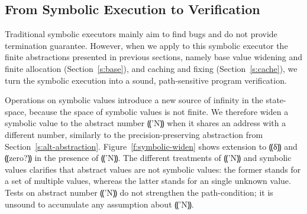 \subsection{From Symbolic Execution to Verification}

Traditional symbolic executors mainly aim to find bugs and do not provide
termination guarantee. However, when we apply to this symbolic executor the
finite abstractions presented in previous sections, namely base value widening
and finite allocation (Section~\ref{s:base}), and caching and fixing
(Section~\ref{s:cache}), we turn the symbolic execution into a sound,
path-sensitive program verification.

Operations on symbolic values introduce a new source of infinity in the
state-space, because the space of symbolic values is not finite. We therefore
widen a symbolic value to the abstract number ⸨'N⸩ when it shares an address
with a different number, similarly to the precision-preserving abstraction from
Section~\ref{s:alt-abstraction}. Figure~\ref{f:symbolic-widen} shows extension
to ⸨δ⸩ and ⸨zero?⸩ in the presence of ⸨'N⸩. The different treatments of ⸨'N⸩
and symbolic values clarifies that abstract values are not symbolic values: the
former stands for a set of multiple values, whereas the latter stands for an
single unknown value. Tests on abstract number ⸨'N⸩ do not strengthen the
path-condition; it is unsound to accumulate any assumption about ⸨'N⸩.

